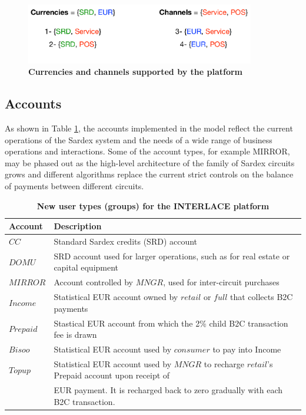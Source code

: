 \vspace{-0.3cm}
\begin{figure}[htbp]
\centering
\includegraphics[width=10cm]{Figures/Curr_Chan}
\caption{\small\textbf{Currencies and channels supported by the platform}}
\label{fig:currchan}
\end{figure}

\subsection{Accounts}
As shown in Table \ref{tab:accounts}, the accounts implemented in the model reflect the current operations of the Sardex system and the needs of a wide range of business operations and interactions. Some of the account types, for example MIRROR, may be phased out as the high-level architecture of the family of Sardex circuits grows and different algorithms replace the current strict controls on the balance of payments between different circuits.

\setlength{\tabcolsep}{10pt}
\begin{table}[htbp]
\begin{centering}
\small
{
\begin{tabular}{| l | l | }
\hline
\textbf{Account}	& \textbf{Description} \\
\hline
$CC$ & Standard Sardex credits (SRD) account \\
\hline
$DOMU$ & SRD account used for larger operations, such as for real estate or capital equipment\\
\hline
$MIRROR$ & Account controlled by $MNGR$, used for inter-circuit purchases \\
\hline
$Income$ & Statistical EUR account owned by $retail$ or $full$ that collects B2C payments\\
\hline
$Prepaid$ & Stastical EUR account from which the 2\% child B2C transaction fee is drawn \\
\hline
$Bisoo$ & Statistical EUR account used by $consumer$ to pay into Income \\
\hline
$Topup$ & Statistical EUR account used by $MNGR$ to recharge $retail$'s Prepaid account upon receipt of \\
&\hspace{0.5cm} EUR payment. It is recharged back to zero gradually with each B2C transaction. \\
\hline
\end{tabular}
}
\caption{\small\textbf{New user types (groups) for the INTERLACE platform}}
\label{tab:accounts}
\vspace{-0.5cm}
\end{centering}
\end{table}

